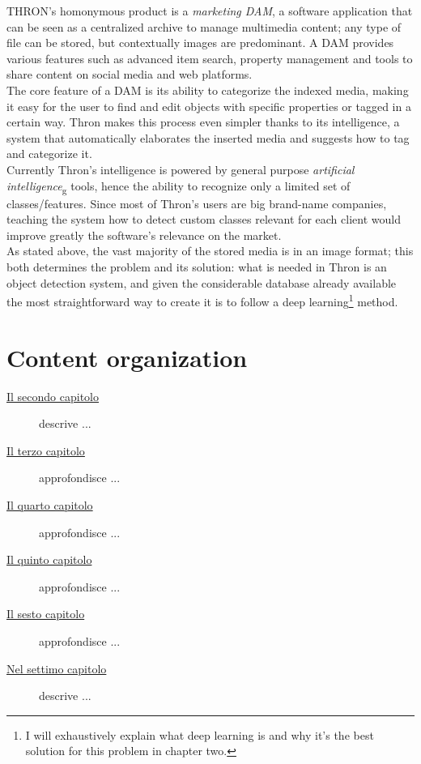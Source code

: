 THRON's homonymous product is a \emph{marketing DAM}, a software application that can be seen as a centralized archive to manage multimedia content; any type of file can be stored, but contextually images are predominant. A DAM provides various features such as advanced item search, property management and tools to share content on social media and web platforms. \\
The core feature of a DAM is its ability to categorize the indexed media, making it easy for the user to find and edit objects with specific properties or tagged in a certain way. Thron makes this process even simpler thanks to its intelligence, a system that automatically elaborates the inserted media and suggests how to tag and categorize it. \\
Currently Thron's intelligence is powered by general purpose \emph{\gls{artificial intelligence}}\textsubscript{g} tools, hence the ability to recognize only a limited set of classes/features. Since most of Thron's users are big brand-name companies, teaching the system how to detect custom classes relevant for each client would improve greatly the software's relevance on the market. \\
As stated above, the vast majority of the stored media is in an image format; this both determines the problem and its solution: what is needed in Thron is an object detection system, and given the considerable database already available the most straightforward way to create it is to follow a deep learning\footnote{I will exhaustively explain what deep learning is and why it's the best solution for this problem in chapter two.} method.



\section{Content organization}

\begin{description}
    \item[{\hyperref[cap:processi-metodologie]{Il secondo capitolo}}] descrive ...
    
    \item[{\hyperref[cap:descrizione-stage]{Il terzo capitolo}}] approfondisce ...
    
    \item[{\hyperref[cap:analisi-requisiti]{Il quarto capitolo}}] approfondisce ...
    
    \item[{\hyperref[cap:progettazione-codifica]{Il quinto capitolo}}] approfondisce ...
    
    \item[{\hyperref[cap:verifica-validazione]{Il sesto capitolo}}] approfondisce ...
    
    \item[{\hyperref[cap:conclusioni]{Nel settimo capitolo}}] descrive ...
\end{description}

